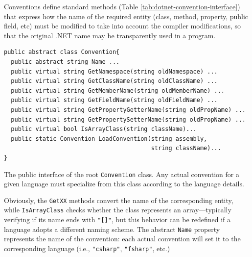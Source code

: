 Conventions define standard methods (Table \ref{tab:dotnet-convention-interface}) that express how the name of the required entity (class, method, property, public field, etc) must be modified to take into account the compiler modifications, so that the original .NET name may be transparently used in a \tuprolog{} program.
%
\begin{table}
{\small
\begin{verbatim}
public abstract class Convention{
  public abstract string Name ...
  public virtual string GetNamespace(string oldNamespace) ...
  public virtual string GetClassName(string oldClassName) ...
  public virtual string GetMemberName(string oldMemberName) ...
  public virtual string GetFieldName(string oldFieldName) ...
  public virtual string GetPropertyGetterName(string oldPropName) ...
  public virtual string GetPropertySetterName(string oldPropName) ...
  public virtual bool IsArrayClass(string className)...
  public static Convention LoadConvention(string assembly,
                                          string className)...
}
\end{verbatim}
}
\caption{The public interface of the root \texttt{Convention} class. Any actual convention for a given language must specialize from this class according to the language details.}
\label{tab:dotnet-convention-interface}
\end{table}
%
Obviously, the \texttt{GetXX} methods convert the name of the corresponding entity, while \texttt{IsArrayClass} checks whether the class represents an array---typically verifying if its name ends with \texttt{"[]"}, but this behavior can be redefined if a language adopts a different naming scheme.
The abstract \texttt{Name} property represents the name of the convention: each actual convention will set it to the corresponding language (i.e., \texttt{"csharp"}, \texttt{"fsharp"}, etc.)

